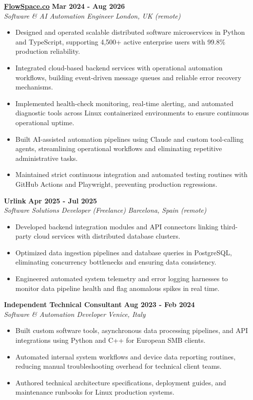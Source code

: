 \documentclass[10pt,a4paper]{article}
\newcommand{\role}[4]{%
  \textbf{#1} \hfill \textbf{#2}\\[1pt]%
  \textit{#3} \hfill \textit{#4}\\[2pt]%
}
\begin{document}
\role{\href{https://flowspace.co}{FlowSpace.co}}{Mar 2024 - Aug 2026}{Software \& AI Automation Engineer}{London, UK (remote)}
\begin{itemize}
  \item Designed and operated scalable distributed software microservices in Python and TypeScript, supporting 4,500+ active enterprise users with 99.8\% production reliability.
  \item Integrated cloud-based backend services with operational automation workflows, building event-driven message queues and reliable error recovery mechanisms.
  \item Implemented health-check monitoring, real-time alerting, and automated diagnostic tools across Linux containerized environments to ensure continuous operational uptime.
  \item Built AI-assisted automation pipelines using Claude and custom tool-calling agents, streamlining operational workflows and eliminating repetitive administrative tasks.
  \item Maintained strict continuous integration and automated testing routines with GitHub Actions and Playwright, preventing production regressions.
\end{itemize}

\role{Urlink}{Apr 2025 - Jul 2025}{Software Solutions Developer (Freelance)}{Barcelona, Spain (remote)}
\begin{itemize}
  \item Developed backend integration modules and API connectors linking third-party cloud services with distributed database clusters.
  \item Optimized data ingestion pipelines and database queries in PostgreSQL, eliminating concurrency bottlenecks and ensuring data consistency.
  \item Engineered automated system telemetry and error logging harnesses to monitor data pipeline health and flag anomalous spikes in real time.
\end{itemize}

\role{Independent Technical Consultant}{Aug 2023 - Feb 2024}{Software \& Automation Developer}{Venice, Italy}
\begin{itemize}
  \item Built custom software tools, asynchronous data processing pipelines, and API integrations using Python and C++ for European SMB clients.
  \item Automated internal system workflows and device data reporting routines, reducing manual troubleshooting overhead for technical client teams.
  \item Authored technical architecture specifications, deployment guides, and maintenance runbooks for Linux production systems.
\end{itemize}
\end{document}
